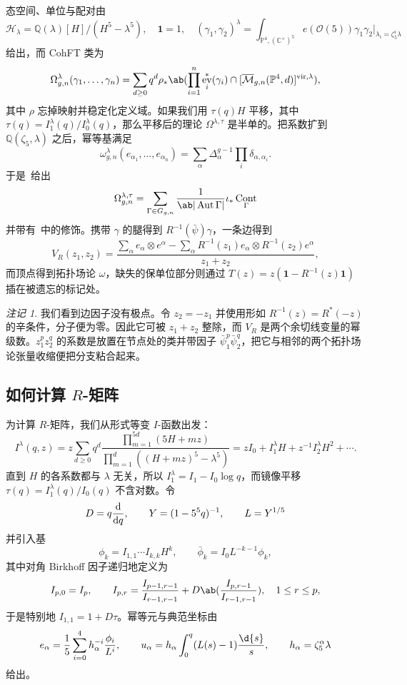 \documentclass{amsart}
\theoremstyle{definition}
\theoremstyle{remark}
\newtheorem{rmk}[thm]{注记}
\theoremstyle{plain}
\theoremstyle{definition}
\theoremstyle{remark}
\newcommand{\C}{\mathbb{C}}
\newcommand{\Q}{\mathbb{Q}}
\renewcommand{\P}{\mathbb{P}}
\newcommand{\Mbar}{\overline{\mathcal{M}}}
\newcommand{\mc}[1]{\mathcal{#1}}
\newcommand{\mr}[1]{\mathrm{#1}}
\newcommand{\1}{\mathbf{1}}
\newcommand{\2}{\mathbf{2}}
\newcommand{\3}{\mathbf{3}}
\newcommand{\vir}{\mr{vir}}
\DeclareMathOperator{\Aut}{Aut}
\DeclareMathOperator{\ev}{ev}
\DeclareMathOperator{\Cont}{Cont}
\begin{document}
态空间、单位与配对由
\[ \mc{H}_{\lambda} = \Q(\lambda)[H]/(H^5-\lambda^5), \quad \1 = 1, \quad (\gamma_1,\gamma_2)^{\lambda} = \int_{\P^4, (\C^{\times})^5} e(\mc{O}(5))\gamma_1\gamma_2 \Big|_{\lambda_i = \zeta_5^i\lambda} \]
给出，而 CohFT 类为
\[ \Omega^{\lambda}_{g,n}(\gamma_1, \ldots, \gamma_n) = \sum_{d \geq 0} q^d \rho_* \ab( \prod_{i=1}^n \ev_i^*(\gamma_i) \cap [\Mbar_{g,n}(\P^4,d)]^{\vir,\lambda}), \]
其中 \(\rho\) 忘掉映射并稳定化定义域。如果我们用 \(\tau(q)H\) 平移，其中 \(\tau(q) = I^{\lambda}_1(q)/I^{\lambda}_0(q)\)，那么平移后的理论 \(\Omega^{\lambda,\tau}\) 是半单的。把系数扩到 \(\Q(\zeta_5,\lambda)\) 之后，幂等基满足
\[ \omega^{\lambda}_{g,n}(e_{\alpha_1}, \ldots, e_{\alpha_n}) = \sum_{\alpha}\Delta_{\alpha}^{g-1}\prod_i \delta_{\alpha,\alpha_i}. \]
于是~给出
\[ \Omega^{\lambda,\tau}_{g,n} = \sum_{\Gamma \in G_{g,n}} \frac{1}{\ab|\Aut\Gamma|}\iota_* \Cont_{\Gamma} \]
并带有~中的修饰。携带 \(\gamma\) 的腿得到 \(R^{-1}(\bar{\psi})\gamma\)，一条边得到
\[ V_R(z_1,z_2) = \frac{\sum_{\alpha} e_{\alpha}\otimes e^{\alpha} - \sum_{\alpha} R^{-1}(z_1)e_{\alpha} \otimes R^{-1}(z_2)e^{\alpha}}{z_1+z_2}, \]
而顶点得到拓扑场论 \(\omega\)，缺失的保单位部分则通过 \(T(z) = z(\1 - R^{-1}(z)\1)\) 插在被遗忘的标记处。

\begin{rmk}
    我们看到边因子没有极点。令 \(z_2 = -z_1\) 并使用形如 \(R^{-1}(z) = R^*(-z)\) 的辛条件，分子便为零。因此它可被 \(z_1+z_2\) 整除，而 \(V_R\) 是两个余切线变量的幂级数。\(z_1^p z_2^q\) 的系数是放置在节点处的类并带因子 \(\bar{\psi}_1^p \bar{\psi}_2^q\)，把它与相邻的两个拓扑场论张量收缩便把分支粘合起来。
\end{rmk}

\subsection{如何计算 \(R\)-矩阵}%
\label{sub:How to compute the R-matrix (Guo)}

为计算 \(R\)-矩阵，我们从形式等变 \(I\)-函数出发：
\[ I^{\lambda}(q,z) = z\sum_{d\geq0}q^d \frac{\prod_{m=1}^{5d}(5H+mz)}{\prod_{m=1}^d ((H+mz)^5 - \lambda^5)} = zI_0 + I_1^{\lambda}H + z^{-1}I_2^{\lambda}H^2 + \cdots. \]
直到 \(H\) 的各系数都与 \(\lambda\) 无关，所以 \(I_1^{\lambda} = I_1 - I_0 \log q\)，而镜像平移 \(\tau(q) = I_1^{\lambda}(q)/I_0(q)\) 不含对数。令
\[ D = q\odv{}{q}, \qquad Y = (1-5^5q)^{-1}, \qquad L = Y^{1/5} \]
并引入基
\[ \phi_k = I_{1,1}\cdots I_{k,k}H^k, \qquad \bar{\phi}_k = I_0 L^{-k-1}\phi_k, \]
其中对角 Birkhoff 因子递归地定义为
\[ I_{p,0} = I_p, \qquad I_{p,r} = \frac{I_{p-1,r-1}}{I_{r-1,r-1}} + D \ab( \frac{I_{p,r-1}}{I_{r-1,r-1}}), \quad 1 \leq r \leq p, \]
于是特别地 \(I_{1,1} = 1+D\tau\)。幂等元与典范坐标由
\[ e_{\alpha} = \frac{1}{5}\sum_{i=0}^4 h_{\alpha}^{-i}\frac{\phi_i}{L^i}, \qquad u_{\alpha} = h_{\alpha}\int_0^q (L(s)-1)\frac{\d{s}}{s}, \qquad h_{\alpha} = \zeta_5^{\alpha}\lambda \]
给出。
\end{document}
